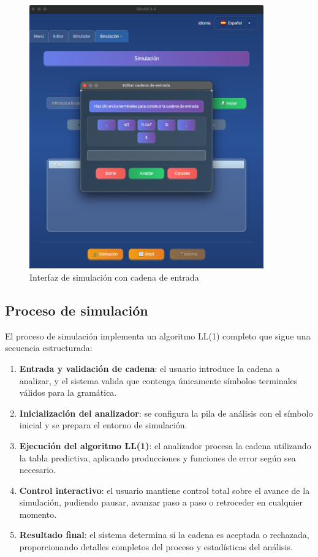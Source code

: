 \needspace{8cm}
\begin{figure}[H]
    \centering
    \includegraphics[width=0.9\textwidth]{figuras/simulador/simulacion_cadenaEntrada.png}
    \caption{Interfaz de simulación con cadena de entrada}
    \label{fig:simulacion_cadena_entrada}
\end{figure}

\subsection{Proceso de simulación}

El proceso de simulación implementa un algoritmo LL(1) completo que sigue una secuencia estructurada:

\begin{enumerate}
    \item \textbf{Entrada y validación de cadena}: el usuario introduce la cadena a analizar, y el sistema valida que contenga únicamente símbolos terminales válidos para la gramática.
    \item \textbf{Inicialización del analizador}: se configura la pila de análisis con el símbolo inicial y se prepara el entorno de simulación.
    \item \textbf{Ejecución del algoritmo LL(1)}: el analizador procesa la cadena utilizando la tabla predictiva, aplicando producciones y funciones de error según sea necesario.
    \item \textbf{Control interactivo}: el usuario mantiene control total sobre el avance de la simulación, pudiendo pausar, avanzar paso a paso o retroceder en cualquier momento.
    \item \textbf{Resultado final}: el sistema determina si la cadena es aceptada o rechazada, proporcionando detalles completos del proceso y estadísticas del análisis.
\end{enumerate}

